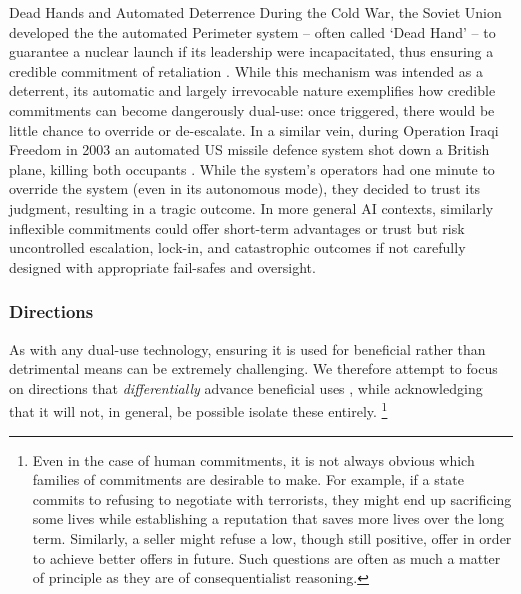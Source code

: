 \begin{case-study}[label=cs:dead_hand]{Dead Hands and Automated Deterrence}
    During the Cold War, the Soviet Union developed the the automated Perimeter system -- often called `Dead Hand' -- to guarantee a nuclear launch if its leadership were incapacitated, thus ensuring a credible commitment of retaliation \citep{Hoffman2009}. While this mechanism was intended as a deterrent, its automatic and largely irrevocable nature exemplifies how credible commitments can become dangerously dual-use: once triggered, there would be little chance to override or de-escalate. 
    In a similar vein, during Operation Iraqi Freedom in 2003 an automated US missile defence system shot down a British plane, killing both occupants \citep{Talbot2005,Borg2024}.
    While the system's operators had one minute to override the system (even in its autonomous mode), they decided to trust its judgment, resulting in a tragic outcome.
    In more general AI contexts, similarly inflexible commitments could offer short-term advantages or trust but risk uncontrolled escalation, lock-in, and catastrophic outcomes if not carefully designed with appropriate fail-safes and oversight.
\end{case-study}

\subsubsection{Directions}


As with any dual-use technology, ensuring it is used for beneficial rather than detrimental means can be extremely challenging.
We therefore attempt to focus on directions that \textit{differentially} advance beneficial uses \citep{Sandbrink2022}, while acknowledging that it will not, in general, be possible isolate these entirely.%
\footnote{Even in the case of human commitments, it is not always obvious which families of commitments are desirable to make. For example, if a state commits to refusing to negotiate with terrorists, they might end up sacrificing some lives while establishing a reputation that saves more lives over the long term. Similarly, a seller might refuse a low, though still positive, offer in order to achieve better offers in future. Such questions are often as much a matter of principle as they are of consequentialist reasoning.}

